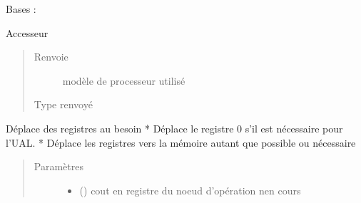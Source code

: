 \documentclass[letterpaper,10pt,french]{sphinxmanual}
\begin{document}
\begin{fulllineitems}
\label{\detokenize{compileexpressionmanager:compileexpressionmanager.CompileExpressionManager}}
Bases : 

\begin{fulllineitems}
\label{\detokenize{compileexpressionmanager:compileexpressionmanager.CompileExpressionManager.engine}}
Accesseur
\begin{quote}\begin{description}
\item[{Renvoie}] \leavevmode
modèle de processeur utilisé

\item[{Type renvoyé}] \leavevmode
{\hyperref[\detokenize{processorengine:processorengine.ProcessorEngine}]{}}

\end{description}\end{quote}

\end{fulllineitems}


\begin{fulllineitems}
\label{\detokenize{compileexpressionmanager:compileexpressionmanager.CompileExpressionManager.getNeededRegisterSpace}}
Déplace des registres au besoin
* Déplace le registre 0 s’il est nécessaire pour l’UAL.
* Déplace les registres vers la mémoire autant que possible ou nécessaire
\begin{quote}\begin{description}
\item[{Paramètres}] \leavevmode\begin{itemize}
\item {} 
 () \textendash{} cout en registre du noeud d’opération nen cours


\end{itemize}
\end{description}
\end{quote}
\end{fulllineitems}
\end{fulllineitems}
\end{document}
